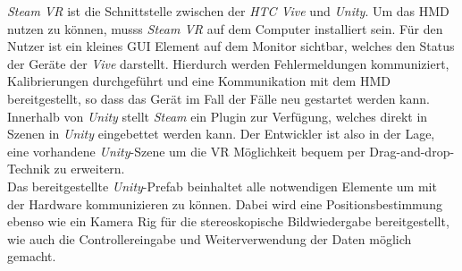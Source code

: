 \textit{Steam VR} \cite{website:steamVR} ist die Schnittstelle zwischen der \textit{HTC Vive} und \textit{Unity}. Um das HMD nutzen zu können, musss \textit{Steam VR} auf dem Computer installiert sein. Für den Nutzer ist ein kleines GUI Element auf dem Monitor sichtbar, welches den Status der Geräte der \textit{Vive} darstellt. Hierdurch werden Fehlermeldungen kommuniziert, Kalibrierungen durchgeführt und eine Kommunikation mit dem HMD bereitgestellt, so dass das Gerät im Fall der Fälle neu gestartet werden kann.\\
Innerhalb von \textit{Unity} stellt \textit{Steam} ein Plugin zur Verfügung, welches direkt in Szenen in \textit{Unity} eingebettet werden kann. Der Entwickler ist also in der Lage, eine vorhandene \textit{Unity}-Szene um die VR Möglichkeit bequem per Drag-and-drop-Technik zu erweitern.\\
Das bereitgestellte \textit{Unity}-Prefab beinhaltet alle notwendigen Elemente um mit der Hardware kommunizieren zu können. Dabei wird eine Positionsbestimmung ebenso wie ein Kamera Rig für die stereoskopische Bildwiedergabe bereitgestellt, wie auch die Controllereingabe und Weiterverwendung der Daten möglich gemacht.


\newpage
